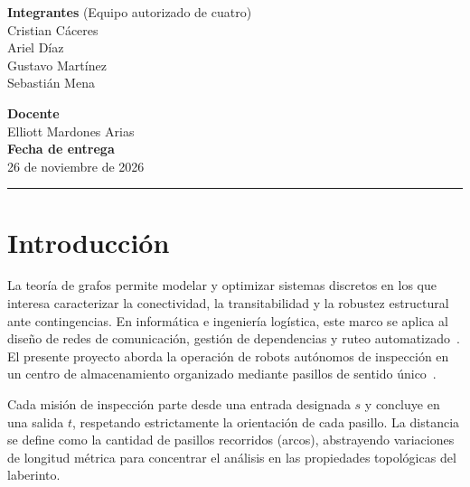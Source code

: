\documentclass[11pt,a4paper]{article}
\begin{document}
\begin{titlepage}
\begin{minipage}[t]{0.55\linewidth}
  \textbf{\color{verde}Integrantes} \small (Equipo autorizado de cuatro)\\[1.5mm]
  Cristian Cáceres\\
  Ariel Díaz\\
  Gustavo Martínez\\
  Sebastián Mena
\end{minipage}
\begin{minipage}[t]{0.42\linewidth}
  \textbf{\color{verde}Docente}\\[1.5mm]
  Elliott Mardones Arias\\[4mm]
  \textbf{\color{verde}Fecha de entrega}\\[1.5mm]
  26 de noviembre de 2026
\end{minipage}
\vspace{4mm}
{\color{oro}\rule{\linewidth}{1.2pt}}
\end{titlepage}

\newpage
{}
\thispagestyle{plain}
{
  \hypersetup{linkcolor=tinta}
  \tableofcontents
}
\newpage
{}

\section{Introducción}

La teoría de grafos permite modelar y optimizar sistemas discretos en los que interesa caracterizar la conectividad, la transitabilidad y la robustez estructural ante contingencias. En informática e ingeniería logística, este marco se aplica al diseño de redes de comunicación, gestión de dependencias y ruteo automatizado~\cite{cormen,sedgewick}. El presente proyecto aborda la operación de robots autónomos de inspección en un centro de almacenamiento organizado mediante pasillos de sentido único~\cite{enunciado}.

Cada misión de inspección parte desde una entrada designada $s$ y concluye en una salida $t$, respetando estrictamente la orientación de cada pasillo. La distancia se define como la cantidad de pasillos recorridos (arcos), abstrayendo variaciones de longitud métrica para concentrar el análisis en las propiedades topológicas del laberinto.
\end{document}
